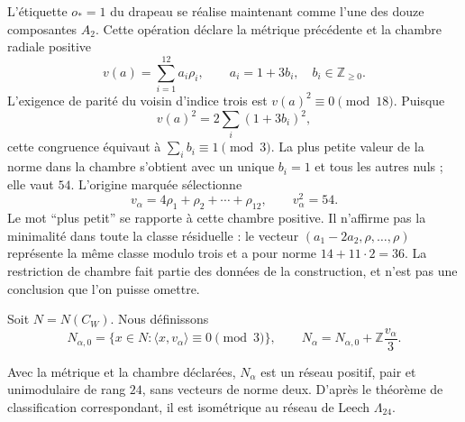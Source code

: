 

L'étiquette $o_*=1$ du drapeau se réalise maintenant comme l'une des
douze composantes $A_2$. Cette opération déclare la métrique précédente et
la chambre radiale positive
\[
 v(a)=\sum_{i=1}^{12}a_i\rho_i,
 \qquad a_i=1+3b_i,\quad b_i\in\mathbb Z_{\geq0}.
\]
L'exigence de parité du voisin d'indice trois est $v(a)^2\equiv0\pmod{18}$. Puisque
\[
 v(a)^2=2\sum_i(1+3b_i)^2,
\]
cette congruence équivaut à $\sum_i b_i\equiv1\pmod3$. La plus petite
valeur de la norme dans la chambre s'obtient avec un unique $b_i=1$ et
tous les autres nuls ; elle vaut $54$. L'origine marquée sélectionne
\begin{equation}
 v_\alpha=4\rho_1+\rho_2+\cdots+\rho_{12},
 \qquad v_\alpha^2=54.
 \label{x_reciprocidad:exc:vector}
\end{equation}
Le mot ``plus petit'' se rapporte à cette chambre positive. Il n'affirme pas la minimalité dans toute la classe résiduelle : le vecteur $(a_1-2a_2,\rho,\ldots,\rho)$ représente la même classe modulo trois et a pour norme $14+11\cdot2=36$. La restriction de chambre fait partie des données de la construction, et n'est pas une conclusion que l'on puisse omettre.

Soit $N=N(C_W)$. Nous définissons
\begin{equation}
 N_{\alpha,0}=\{x\in N:\langle x,v_\alpha\rangle\equiv0\pmod3\},
 \qquad
 N_\alpha=N_{\alpha,0}+\mathbb Z\frac{v_\alpha}{3}.
 \label{x_reciprocidad:exc:vecino}
\end{equation}

\begin{theorem}
\label{x_reciprocidad:exc:teorema-leech}
Avec la métrique et la chambre déclarées, $N_\alpha$ est un réseau
positif, pair et unimodulaire de rang $24$, sans vecteurs de norme deux.
D'après le théorème de classification correspondant, il est isométrique au
réseau de Leech $\Lambda_{24}$.
\end{theorem}

